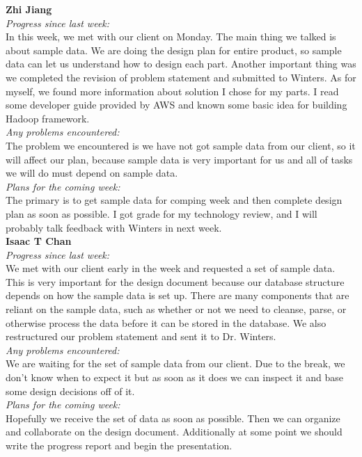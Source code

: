 \textbf{Zhi Jiang}\\
\noindent\textit{Progress since last week:}\\
In this week, we met with our client on Monday. The main thing we talked is about sample data. We are doing the design plan for entire product, so sample data can let us understand how to design each part. Another important thing was we completed the revision of problem statement and submitted to Winters. As for myself, we found more information about solution I chose for my parts. I read some developer guide provided by AWS and known some basic idea for building Hadoop framework.\\

\noindent\textit{Any problems encountered:}\\
The problem we encountered is we have not got sample data from our client, so it will affect our plan, because sample data is very important for us and all of tasks we will do must depend on sample data.\\

\noindent\textit{Plans for the coming week:}\\
The primary is to get sample data for comping week and then complete design plan as soon as possible. I got grade for my technology review, and I will probably talk feedback with Winters in next week.\\

\noindent\textbf{Isaac T Chan}\\
\noindent\textit{Progress since last week:}\\
We met with our client early in the week and requested a set of sample data. This is very important for the design document because our database structure depends on how the sample data is set up. There are many components that are reliant on the sample data, such as whether or not we need to cleanse, parse, or otherwise process the data before it can be stored in the database. We also restructured our problem statement and sent it to Dr. Winters.\\

\noindent\textit{Any problems encountered:}\\
We are waiting for the set of sample data from our client. Due to the break, we don't know when to expect it but as soon as it does we can inspect it and base some design decisions off of it.\\

\noindent\textit{Plans for the coming week:}\\
Hopefully we receive the set of data as soon as possible. Then we can organize and collaborate on the design document. Additionally at some point we should write the progress report and begin the presentation.\\

